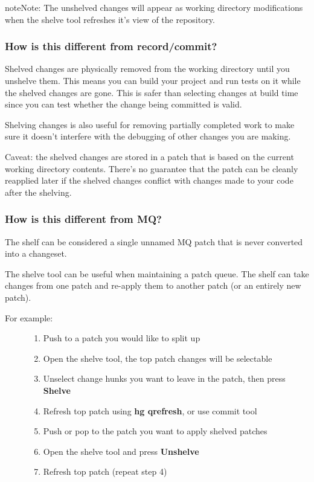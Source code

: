 \documentclass[letterpaper,10pt,english]{manual}
\begin{document}
\begin{notice}{note}{Note:}
The unshelved changes will appear as working directory modifications
when the shelve tool refreshes it's view of the repository.
\end{notice}


\subsubsection{How is this different from record/commit?}

Shelved changes are physically removed from the working directory until
you unshelve them.  This means you can build your project and run tests
on it while the shelved changes are gone.  This is safer than selecting
changes at build time since you can test whether the change being
committed is valid.

Shelving changes is also useful for removing partially completed work to
make sure it doesn't interfere with the debugging of other changes you
are making.

Caveat: the shelved changes are stored in a patch that is based on the
current working directory contents. There's no guarantee that the patch
can be cleanly reapplied later if the shelved changes conflict with
changes made to your code after the shelving.


\subsubsection{How is this different from MQ?}

The shelf can be considered a single unnamed MQ patch that is never
converted into a changeset.

The shelve tool can be useful when maintaining a patch queue.
The shelf can take changes from one patch and re-apply them to another
patch (or an entirely new patch).
\begin{description}
\item[For example:]\begin{enumerate}
\item {} 
Push to a patch you would like to split up

\item {} 
Open the shelve tool, the top patch changes will be selectable

\item {} 
Unselect change hunks you want to leave in the patch, then press
\textbf{Shelve}

\item {} 
Refresh top patch using \textbf{hg qrefresh}, or use commit tool

\item {} 
Push or pop to the patch you want to apply shelved patches

\item {} 
Open the shelve tool and press \textbf{Unshelve}

\item {} 
Refresh top patch (repeat step 4)

\end{enumerate}

\end{description}
\end{document}
